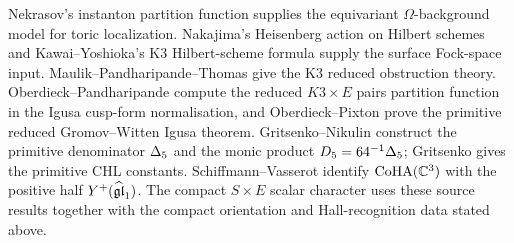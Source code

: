 Nekrasov's instanton partition function supplies the equivariant
$\Omega$-background model for toric localization.  Nakajima's
Heisenberg action on Hilbert schemes and Kawai--Yoshioka's K3
Hilbert-scheme formula supply the surface Fock-space input.
Maulik--Pandharipande--Thomas give the K3 reduced obstruction theory.
Oberdieck--Pandharipande compute the reduced $K3\times E$ pairs
partition function in the Igusa cusp-form normalisation, and
Oberdieck--Pixton prove the primitive reduced Gromov--Witten Igusa
theorem.  Gritsenko--Nikulin construct the primitive denominator
$\Delta_5$ and the monic product $D_5=64^{-1}\Delta_5$; Gritsenko
gives the primitive CHL constants.  Schiffmann--Vasserot identify
$\operatorname{CoHA}(\mathbb C^3)$ with the positive half
$Y^{+}(\widehat{\mathfrak{gl}}_1)$.  The compact $S\times E$ scalar
character uses these source results together with the compact
orientation and Hall-recognition data stated above.
